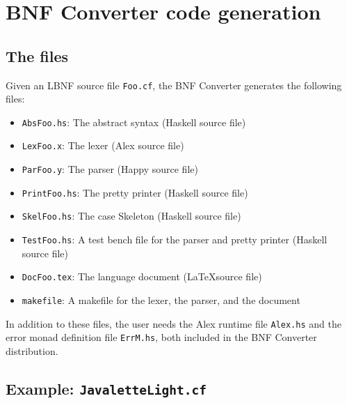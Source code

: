 \documentclass[10pt]{article}
\begin{document}
\section{BNF Converter code generation}

\subsection{The files}

Given an LBNF source file {\tt Foo.cf},
the BNF Converter generates the following files:
\begin{itemize}
 \item {\tt AbsFoo.hs}: The abstract syntax (Haskell source file)
 \item {\tt LexFoo.x}: The lexer (Alex source file)
 \item {\tt ParFoo.y}: The parser (Happy source file)
 \item {\tt PrintFoo.hs}: The pretty printer (Haskell source file)
 \item {\tt SkelFoo.hs}: The case Skeleton (Haskell source file)
 \item {\tt TestFoo.hs}: A test bench file for the parser and pretty printer (Haskell source file)
 \item {\tt DocFoo.tex}: The language document (\LaTeX source file)
 \item {\tt makefile}: A makefile for the lexer, the parser, and the document
\end{itemize}
In addition to these files, the user needs the Alex runtime file
{\tt Alex.hs} and the error monad definition file {\tt ErrM.hs}, both
included in the BNF Converter distribution.



\subsection{Example: {\tt JavaletteLight.cf}}
\end{document}
